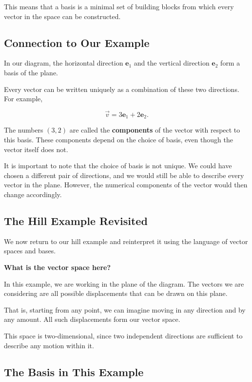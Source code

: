 \documentclass[11pt,openany]{book}
\theoremstyle{definition}
\begin{document}
\medskip

This means that a basis is a minimal set of building blocks from which every vector in the space can be constructed.

\medskip

\subsection{Connection to Our Example}

In our diagram, the horizontal direction $\mathbf{e}_1$ and the vertical direction $\mathbf{e}_2$ form a basis of the plane.

Every vector can be written uniquely as a combination of these two directions.
For example,

\[
\vec{v} = 3\mathbf{e}_1 + 2\mathbf{e}_2.
\]

The numbers $(3,2)$ are called the \textbf{components} of the vector with respect to this basis.
These components depend on the choice of basis, even though the vector itself does not.
\medskip

It is important to note that the choice of basis is not unique.
We could have chosen a different pair of directions, and we would still be able to describe every vector in the plane.
However, the numerical components of the vector would then change accordingly.


\subsection{The Hill Example Revisited}

We now return to our hill example and reinterpret it using the language of vector spaces and bases.

\medskip

\textbf{What is the vector space here?}

In this example, we are working in the plane of the diagram.
The vectors we are considering are all possible displacements that can be drawn on this plane.

That is, starting from any point, we can imagine moving in any direction and by any amount.
All such displacements form our vector space.

This space is two-dimensional, since two independent directions are sufficient to describe any motion within it.

\medskip

\subsection{The Basis in This Example}
\end{document}
